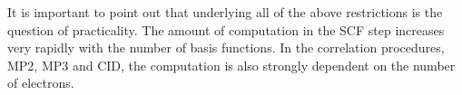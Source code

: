 It is important to point out that underlying all of the above restrictions
is the question of practicality.  The amount of computation in the SCF step
increases very rapidly with the number of basis functions.  In the correlation
procedures, MP2, MP3 and CID, the computation is also strongly dependent
on the number of electrons.
